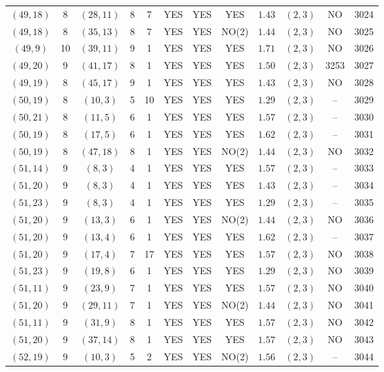 \begin{longtable}{|c|c|c|c|c|c|c|c|c|c|c|c|}
$(49,18)$ & 8 & $(28,11)$ & 8 & 7 & YES & YES & YES & $1.43$ & $(2,3)$ & NO & 3024\\
$(49,18)$ & 8 & $(35,13)$ & 8 & 7 & YES & YES & NO(2) & $1.44$ & $(2,3)$ & NO & 3025\\
$(49,9)$ & 10 & $(39,11)$ & 9 & 1 & YES & YES & YES & $1.71$ & $(2,3)$ & NO & 3026\\
$(49,20)$ & 9 & $(41,17)$ & 8 & 1 & YES & YES & YES & $1.50$ & $(2,3)$ & 3253 & 3027\\
$(49,19)$ & 8 & $(45,17)$ & 9 & 1 & YES & YES & YES & $1.43$ & $(2,3)$ & NO & 3028\\
$(50,19)$ & 8 & $(10,3)$ & 5 & 10 & YES & YES & YES & $1.29$ & $(2,3)$ & -- & 3029\\
$(50,21)$ & 8 & $(11,5)$ & 6 & 1 & YES & YES & YES & $1.57$ & $(2,3)$ & -- & 3030\\
$(50,19)$ & 8 & $(17,5)$ & 6 & 1 & YES & YES & YES & $1.62$ & $(2,3)$ & -- & 3031\\
$(50,19)$ & 8 & $(47,18)$ & 8 & 1 & YES & YES & NO(2) & $1.44$ & $(2,3)$ & NO & 3032\\
$(51,14)$ & 9 & $(8,3)$ & 4 & 1 & YES & YES & YES & $1.57$ & $(2,3)$ & -- & 3033\\
$(51,20)$ & 9 & $(8,3)$ & 4 & 1 & YES & YES & YES & $1.43$ & $(2,3)$ & -- & 3034\\
$(51,23)$ & 9 & $(8,3)$ & 4 & 1 & YES & YES & YES & $1.29$ & $(2,3)$ & -- & 3035\\
$(51,20)$ & 9 & $(13,3)$ & 6 & 1 & YES & YES & NO(2) & $1.44$ & $(2,3)$ & NO & 3036\\
$(51,20)$ & 9 & $(13,4)$ & 6 & 1 & YES & YES & YES & $1.62$ & $(2,3)$ & -- & 3037\\
$(51,20)$ & 9 & $(17,4)$ & 7 & 17 & YES & YES & YES & $1.57$ & $(2,3)$ & NO & 3038\\
$(51,23)$ & 9 & $(19,8)$ & 6 & 1 & YES & YES & YES & $1.29$ & $(2,3)$ & NO & 3039\\
$(51,11)$ & 9 & $(23,9)$ & 7 & 1 & YES & YES & YES & $1.57$ & $(2,3)$ & NO & 3040\\
$(51,20)$ & 9 & $(29,11)$ & 7 & 1 & YES & YES & NO(2) & $1.44$ & $(2,3)$ & NO & 3041\\
$(51,11)$ & 9 & $(31,9)$ & 8 & 1 & YES & YES & YES & $1.57$ & $(2,3)$ & NO & 3042\\
$(51,20)$ & 9 & $(37,14)$ & 8 & 1 & YES & YES & YES & $1.57$ & $(2,3)$ & NO & 3043\\
$(52,19)$ & 9 & $(10,3)$ & 5 & 2 & YES & YES & NO(2) & $1.56$ & $(2,3)$ & -- & 3044\\

\end{longtable}
